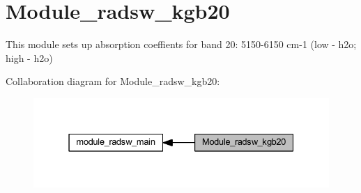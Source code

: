 \hypertarget{group__module__radsw__kgb20}{}\section{Module\+\_\+radsw\+\_\+kgb20}
\label{group__module__radsw__kgb20}


This module sets up absorption coeffients for band 20\+: 5150-\/6150 cm-\/1 (low -\/ h2o; high -\/ h2o)  


Collaboration diagram for Module\+\_\+radsw\+\_\+kgb20\+:\nopagebreak
\begin{figure}[H]
\begin{center}
\leavevmode
\includegraphics[width=331pt]{group__module__radsw__kgb20}
\end{center}
\end{figure}
